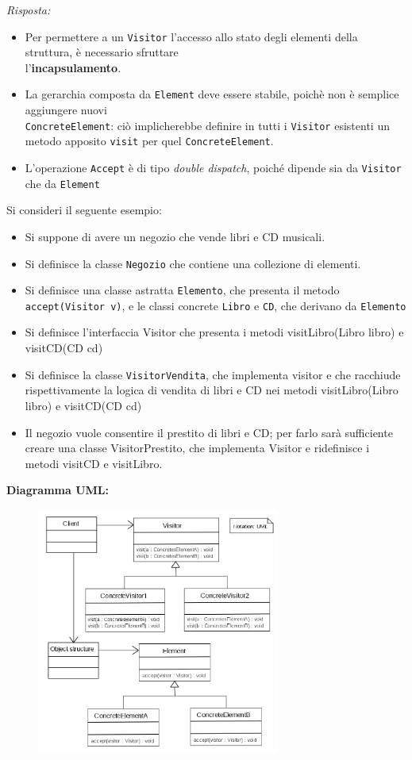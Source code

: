 \documentclass{article}
\newenvironment{solution}
    {\textit{Risposta:}}
    {}
\begin{document}
\begin{solution}
\begin{itemize}
	\item Per permettere a un \texttt{Visitor} l'accesso allo stato degli elementi della struttura, è necessario sfruttare
	\\l'\textbf{incapsulamento}.
	\item La gerarchia composta da \texttt{Element} deve essere stabile, poichè non è semplice aggiungere nuovi \\\texttt{ConcreteElement}: ciò implicherebbe definire in tutti i \texttt{Visitor} esistenti un metodo apposito \texttt{visit} per quel \texttt{ConcreteElement}.
	\item L'operazione \texttt{Accept} è di tipo \textit{double dispatch}, poiché dipende sia da \texttt{Visitor} che da \texttt{Element}
\end{itemize}
Si consideri il seguente esempio:
\begin{itemize}
	\item Si suppone di avere un negozio che vende libri e CD musicali.
	\item Si definisce la classe \texttt{Negozio} che contiene una collezione di elementi.
	\item Si definisce una classe astratta \texttt{Elemento}, che presenta il metodo \texttt{accept(Visitor v)}, e le classi concrete \texttt{Libro} e \texttt{CD}, che derivano da \texttt{Elemento}
	\item Si definisce l'interfaccia Visitor che presenta i metodi visitLibro(Libro libro) e visitCD(CD cd)
	\item Si definisce la classe \texttt{VisitorVendita}, che implementa visitor e che racchiude rispettivamente la logica di vendita di libri e CD nei metodi visitLibro(Libro libro) e visitCD(CD cd)
	\item Il negozio vuole consentire il prestito di libri e CD; per farlo sarà sufficiente creare una classe VisitorPrestito, che implementa Visitor e ridefinisce i metodi visitCD e visitLibro.
\end{itemize}

\textbf{Diagramma UML:}
\begin{figure}[htb!]
	\centering
	\label{ObserverPattern}
	\includegraphics[width=8cm]{./immagini/visitorPattern.png}
\end{figure}
\end{solution}
\end{document}
